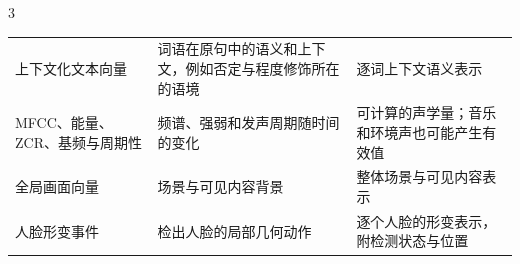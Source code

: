 \begin{PaperTable}{3}
\begin{table}[!htbp]
\begin{tabular}{@{}lll@{}}
\begin{minipage}[t]{\dimexpr 0.260000\linewidth-1.040000\tabcolsep\relax}\raggedright
上下文化文本向量\strut
\end{minipage} & \begin{minipage}[t]{\dimexpr 0.440000\linewidth-1.760000\tabcolsep\relax}\raggedright
词语在原句中的语义和上下文，例如否定与程度修饰所在的语境\strut
\end{minipage} & \begin{minipage}[t]{\dimexpr 0.300000\linewidth-1.200000\tabcolsep\relax}\raggedright
逐词上下文语义表示\strut
\end{minipage}\tabularnewline
\begin{minipage}[t]{\dimexpr 0.260000\linewidth-1.040000\tabcolsep\relax}\raggedright
MFCC、能量、ZCR、基频与周期性\strut
\end{minipage} & \begin{minipage}[t]{\dimexpr 0.440000\linewidth-1.760000\tabcolsep\relax}\raggedright
频谱、强弱和发声周期随时间的变化\strut
\end{minipage} & \begin{minipage}[t]{\dimexpr 0.300000\linewidth-1.200000\tabcolsep\relax}\raggedright
可计算的声学量；音乐和环境声也可能产生有效值\strut
\end{minipage}\tabularnewline
\begin{minipage}[t]{\dimexpr 0.260000\linewidth-1.040000\tabcolsep\relax}\raggedright
全局画面向量\strut
\end{minipage} & \begin{minipage}[t]{\dimexpr 0.440000\linewidth-1.760000\tabcolsep\relax}\raggedright
场景与可见内容背景\strut
\end{minipage} & \begin{minipage}[t]{\dimexpr 0.300000\linewidth-1.200000\tabcolsep\relax}\raggedright
整体场景与可见内容表示\strut
\end{minipage}\tabularnewline
\begin{minipage}[t]{\dimexpr 0.260000\linewidth-1.040000\tabcolsep\relax}\raggedright
人脸形变事件\strut
\end{minipage} & \begin{minipage}[t]{\dimexpr 0.440000\linewidth-1.760000\tabcolsep\relax}\raggedright
检出人脸的局部几何动作\strut
\end{minipage} & \begin{minipage}[t]{\dimexpr 0.300000\linewidth-1.200000\tabcolsep\relax}\raggedright
逐个人脸的形变表示，附检测状态与位置\strut
\end{minipage}\tabularnewline
\bottomrule
\end{tabular}
\end{table}

\end{PaperTable}

